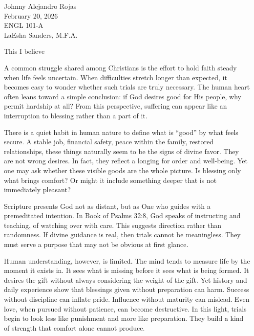 \documentclass[12pt]{article}
\begin{document}
\noindent
Johnny Alejandro Rojas\\
February 20, 2026\\
ENGL 101-A\\
LaEsha Sanders, M.F.A.

\vspace{1em}

\begin{center}
This I believe
\end{center}

A common struggle shared among Christians is the effort to hold faith steady
when life feels uncertain. When difficulties stretch longer than expected, it
becomes easy to wonder whether such trials are truly necessary. The human heart
often leans toward a simple conclusion: if God desires good for His people, why
permit hardship at all? From this perspective, suffering can appear like an
interruption to blessing rather than a part of it.

There is a quiet habit in human nature to define what is “good” by what feels
secure. A stable job, financial safety, peace within the family, restored
relationships, these things naturally seem to be the signs of divine favor. They
are not wrong desires. In fact, they reflect a longing for order and well-being.
Yet one may ask whether these visible goods are the whole picture. Is blessing
only what brings comfort? Or might it include something deeper that is not
immediately pleasant?

Scripture presents God not as distant, but as One who guides with a premeditated
intention. In Book of Psalms 32:8, God speaks of instructing and teaching, of
watching over with care. This suggests direction rather than randomness. If
divine guidance is real, then trials cannot be meaningless. They must serve a
purpose that may not be obvious at first glance.

Human understanding, however, is limited. The mind tends to measure life by the
moment it exists in. It sees what is missing before it sees what is being formed. It
desires the gift without always considering the weight of the gift. Yet history
and daily experience show that blessings given without preparation can harm.
Success without discipline can inflate pride. Influence without maturity can
mislead. Even love, when pursued without patience, can become destructive. In
this light, trials begin to look less like punishment and more like preparation.
They build a kind of strength that comfort alone cannot produce.
\end{document}
